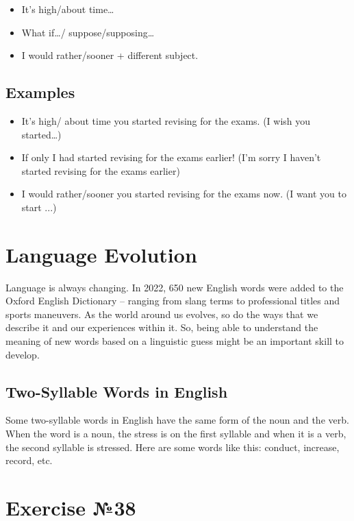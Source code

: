 \begin{itemize}
      \item It’s high/about time…
      \item What if…/ suppose/supposing…
      \item I would rather/sooner + different subject.
\end{itemize}

\subsection*{Examples}

\begin{itemize}
      \item It’s high/ about time you started revising for the exams. (I wish you started…)
      \item If only I had started revising for the exams earlier! (I’m sorry I haven’t started revising for the exams earlier)
      \item I would rather/sooner you started revising for the exams now. (I want you to start ...)
\end{itemize}

\section*{Language Evolution}

Language is always changing. In 2022, 650 new English words were added to the Oxford English Dictionary – ranging from slang terms to professional titles and sports maneuvers. As the world around us evolves, so do the ways that we describe it and our experiences within it. So, being able to understand the meaning of new words based on a linguistic guess might be an important skill to develop.

\subsection*{Two-Syllable Words in English}

Some two-syllable words in English have the same form of the noun and the verb. When the word is a noun, the stress is on the first syllable and when it is a verb, the second syllable is stressed. Here are some words like this: conduct, increase, record, etc.

\section{Exercise №38}
